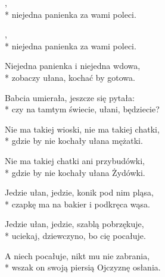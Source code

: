 \begin{lyrics}[longestline={Nie ma takiej wioski, nie ma takiej chatki,}]

,\\*
niejedna panienka za wami poleci.

\begin{chorus}
,\\*
niejedna panienka za wami poleci.
\end{chorus}

Niejedna panienka i niejedna wdowa,\\*
zobaczy ułana, kochać by gotowa.

\chorusref

Babcia umierała, jeszcze się pytała:\\*
czy na tamtym świecie, ułani, będziecie?

\chorusref

Nie ma takiej wioski, nie ma takiej chatki,\\*
gdzie by nie kochały ułana mężatki.

\chorusref

Nie ma takiej chatki ani przybudówki,\\*
gdzie by nie kochały ułana Żydówki.

\chorusref

Jedzie ułan, jedzie, konik pod nim pląsa,\\*
czapkę ma na bakier i podkręca wąsa.

\chorusref

Jedzie ułan, jedzie, szablą pobrzękuje,\\*
uciekaj, dziewczyno, bo cię pocałuje.

\chorusref

A niech pocałuje, nikt mu nie zabrania,\\*
wszak on swoją piersią Ojczyznę osłania.

\chorusref
\end{lyrics}




